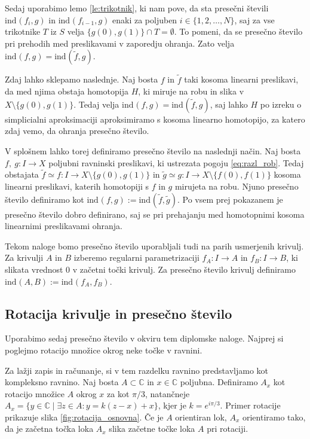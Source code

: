 \documentclass[mat1]{fmfdelo}
\newcommand{\C}{\mathbb C}
\newcommand{\ind}[3][]{\text{ind}_{#1}(#2, #3)}
\begin{document}
Sedaj uporabimo lemo \ref{le:trikotnik}, ki nam pove, da sta presečni števili $\ind{f_i}{g}$ in $\ind{f_{i-1}}{g}$ enaki za poljuben $i\in \{1, 2, \ldots , N\}$, saj za vse trikotnike $T$ iz $S$ velja $\{g(0), g(1) \} \cap T = \emptyset$. To pomeni, da se presečno število pri prehodih med preslikavami v zaporedju ohranja. Zato velja $\ind{f}{g} = \ind{\widetilde{f}}{g}$.
\endproof

Zdaj lahko sklepamo naslednje. Naj bosta $f$ in $\widetilde{f}$ taki kosoma linearni preslikavi, da med njima obstaja homotopija $H$, ki miruje na robu in slika v $X \setminus \{ g(0), g(1)\}$. Tedaj velja $\ind{f}{g} = \ind{\widetilde{f}}{g}$, saj lahko $H$ po izreku o simplicialni aproksimaciji \cite{hatcher_alg_top} aproksimiramo s kosoma linearno homotopijo, za katero zdaj vemo, da ohranja presečno število. 

V splošnem lahko torej definiramo presečno število na naslednji način. Naj bosta $f,\ g\colon I \to X$ poljubni ravninski preslikavi, ki ustrezata pogoju \eqref{eq:razl_rob}. Tedaj obstajata $\widetilde{f} \simeq f\colon I \to X \setminus \{g(0), g(1)\}$ in $\widetilde{g} \simeq g\colon I \to X \setminus \{f(0), f(1)\}$ kosoma linearni preslikavi, katerih homotopiji s $f$ in $g$ mirujeta na robu. Njuno presečno število definiramo kot $\ind{f}{g} := \ind{\widetilde{f}}{\widetilde{g}}$. Po vsem prej pokazanem je presečno število dobro definirano, saj se pri prehajanju med homotopnimi kosoma linearnimi preslikavami ohranja.

Tekom naloge bomo presečno število uporabljali tudi na parih usmerjenih krivulj. Za krivulji $A$ in $B$ izberemo regularni parametrizaciji $f_A \colon I \to A$ in $f_B \colon I \to B$, ki slikata vrednost $0$ v začetni točki krivulj. Za presečno število krivulj definiramo $\ind{A}{B} := \ind{f_A}{f_B}$.

\subsection{Rotacija krivulje in presečno število}

Uporabimo sedaj presečno število v okviru tem diplomske naloge. Najprej si poglejmo rotacijo množice okrog neke točke v ravnini.

Za lažji zapis in računanje, si v tem razdelku ravnino predstavljamo kot kompleksno ravnino. Naj bosta $A \subset \C$ in $x \in \C$ poljubna. Definiramo $A_x$ kot rotacijo množice $A$ okrog $x$ za kot $\pi/3$, natančneje $A_x = \{ y \in \C \mid \exists z \in A: y = k(z-x) + x\}$, kjer je $k = e^{i\pi / 3}$. Primer rotacije prikazuje slika \ref{fig:rotacija_osnovna}. Če je $A$ orientiran lok, $A_x$ orientiramo tako, da je začetna točka loka $A_x$ slika začetne točke loka $A$ pri rotaciji.
\end{document}
